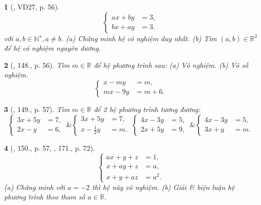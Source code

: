 \documentclass{article}
\newtheorem{baitoan}{}
\begin{document}
\begin{baitoan}[\cite{Tuyen_Toan_9_old}, VD27, p. 56]
	\begin{equation*}
		\left\{\begin{split}
			ax + by &= 3,\\
			bx + ay &= 3.
		\end{split}\right.
	\end{equation*}
	với $a,b\in\mathbb{N}^\star,a\ne b$. (a) Chứng minh hệ có nghiệm duy nhất. (b) Tìm $(a,b)\in\mathbb{R}^2$ để hệ có nghiệm nguyên dương.
\end{baitoan}

\begin{baitoan}[\cite{Tuyen_Toan_9_old}, 148., p. 56]
	Tìm $m\in\mathbb{R}$ để hệ phương trình sau: (a) Vô nghiệm. (b) Vô số nghiệm.
	\begin{equation*}
		\left\{\begin{split}
			x - my &= m,\\
			mx - 9y &= m + 6.
		\end{split}\right.
	\end{equation*}	
\end{baitoan}

\begin{baitoan}[\cite{Tuyen_Toan_9_old}, 149., p. 57]
	Tìm $m\in\mathbb{R}$ để 2 hệ phương trình tương đương:
	\begin{equation*}
		\left\{\begin{split}
			3x + 5y &= 7,\\
			2x - y &= 6,
		\end{split}\right.\ \&
		\left\{\begin{split}
			3x + 5y &= 7,\\
			x - \frac{1}{2}y &= m.
		\end{split}\right.\  \left\{\begin{split}
			4x - 3y &= 5,\\
			2x + 5y &= 9,
		\end{split}\right.\ \&
		\left\{\begin{split}
			4x - 3y &= 5,\\
			3x + y &= m.
		\end{split}\right.
	\end{equation*}
\end{baitoan}

\begin{baitoan}[\cite{Tuyen_Toan_9_old}, 150., p. 57, \cite{Dong_23_1001_toan_I}, 171., p. 72]
	\begin{equation*}
		\left\{\begin{split}
			ax + y + z &= 1,\\
			x + ay + z &= a,\\
			x + y + az &= a^2.
		\end{split}\right.
	\end{equation*}
	(a) Chứng minh với $a = -2$ thì hệ này vô nghiệm. (b) Giải \& biện luận hệ phương trình theo tham số $a\in\mathbb{R}$.
\end{baitoan}
\end{document}
